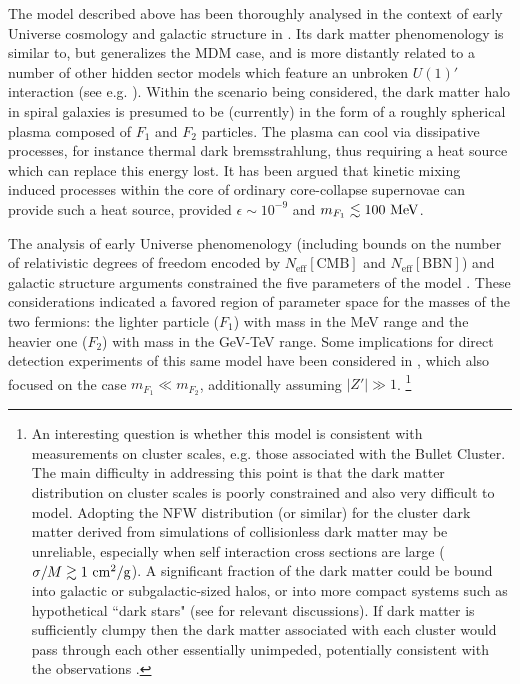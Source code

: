 \documentclass[12pt]{article}
\begin{document}
The model described above has been thoroughly analysed in the context of early Universe cosmology and galactic structure in \cite{dhsdm}. Its dark matter phenomenology is similar to, but generalizes the MDM case, and is more distantly related to a number of other hidden sector models which feature an unbroken $U(1)'$ interaction (see e.g. \cite{unbroken}). Within the scenario being considered, the dark matter halo in spiral galaxies is presumed to be (currently) in the form of a roughly spherical plasma composed of $F_1$ and $F_2$ particles. The plasma can cool via dissipative processes, for instance thermal dark bremsstrahlung, thus requiring a heat source which can replace this energy lost. It has been argued that kinetic mixing induced processes within the core of ordinary core-collapse supernovae can provide such a heat source, provided $\epsilon \sim 10 ^{-9}$ and $m _{F_1} \lesssim 100 \ {\rm MeV}$. 

The analysis of early Universe phenomenology (including bounds on the number of relativistic degrees of freedom encoded by 
$N _{\text{eff}}[\text{CMB}]$ and $N_{\text{eff}}[\text{BBN}]$) and galactic structure arguments constrained the five parameters of the model \cite{dhsdm}. These considerations indicated a favored region of parameter space for the masses of the two fermions: the lighter particle ($F_1$) with mass in the MeV range and the heavier one ($F_2$) with mass in the GeV-TeV range. Some implications for direct detection experiments of this same model have been considered in \cite{hiddensector}, which also focused on the case $m _{F_1} \ll m _{F_2}$, additionally assuming $|Z'| \gg 1$.
\footnote{An interesting question is whether this model is consistent with measurements on cluster scales, e.g. those associated with the Bullet Cluster. 
The main difficulty in 
addressing this point is that the dark matter distribution on cluster scales is poorly constrained and also very difficult to model. 
Adopting the NFW distribution (or similar) for the cluster dark matter derived from simulations of collisionless dark matter may be unreliable, especially when
self interaction cross sections are large ($\sigma/M \gtrsim 1 \ \rm{cm}^2/\rm{g}$).  
A significant fraction of the dark matter could be bound into galactic or subgalactic-sized halos, or into more compact systems 
such as hypothetical ``dark stars" (see \cite{silagadze,review,dhsdm} for relevant discussions). 
If dark matter is sufficiently clumpy then the dark matter 
associated with each cluster would pass through each other essentially unimpeded, potentially consistent with the observations \cite{bullet}.}  
\end{document}
